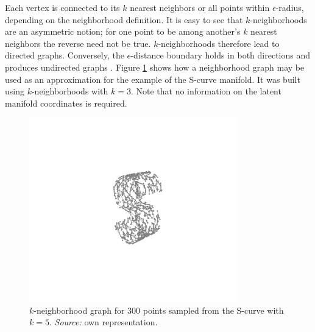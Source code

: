 \begin{minipage}[b]{0.5\textwidth}
  Each vertex is connected to its $k$ nearest neighbors or all points 
  within $\epsilon$-radius, depending on the neighborhood definition.
  It is easy to see that $k$-neighborhoods are an asymmetric notion; for one 
  point to be among another's $k$ nearest neighbors the reverse need not be 
  true.
  $k$-neighborhoods therefore lead to directed graphs.
  Conversely, the $\epsilon$-distance boundary holds in both directions and 
  produces undirected graphs \citep{heetal2005}.
  Figure \ref{fig:neighbor-graph} shows how a neighborhood graph may be used as 
  an approximation for the example of the S-curve manifold.
  It was built using $k$-neighborhoods with $k = 3$.
  Note that no information on the latent manifold coordinates is required.
\end{minipage}
\begin{minipage}[b]{0.05\textwidth}
  \phantom{xxx}
\end{minipage}
\begin{minipage}[b]{0.45\textwidth}
  \begin{figure}[H]
    \centering
    \includegraphics[trim = 250 170 200 100, clip, %
      width = 0.8\textwidth]{figures/s-curve-connected}
    \caption[S-curve neighborhood graph]{$k$-neighborhood graph for 300 points 
    sampled from the S-curve with $k = 5$.
    \textit{Source:} own representation.}
    \label{fig:neighbor-graph}
  \end{figure}
\end{minipage}

